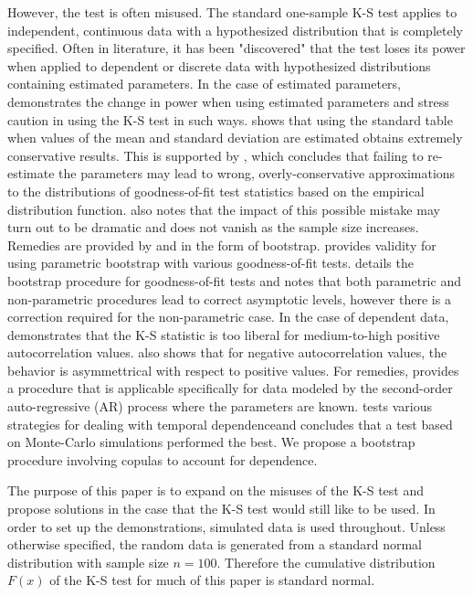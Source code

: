 \documentclass[12pt, letterpaper, titlepage]{article}
\begin{document}
However, the test is often misused. The standard one-sample K-S test applies to 
independent, continuous data with a hypothesized distribution that is completely specified. 
Often in literature, it has been "discovered" that the test loses its power when 
applied to dependent or discrete data with hypothesized distributions containing 
estimated parameters. In the case of estimated parameters, \citet{Steinskog} 
demonstrates the change in power when using estimated parameters and stress caution in 
using the K-S test in such ways. \citet{Lilliefors} shows 
that using the standard table when values of the mean and standard deviation are 
estimated obtains extremely conservative results. This is supported by \citet{Capasso}, which 
concludes that failing to re-estimate the parameters may lead to wrong, overly-conservative 
approximations to the distributions of goodness-of-fit test statistics based on the empirical 
distribution function. \citet{Capasso} also notes that the impact of this possible mistake 
may turn out to be dramatic and does not vanish as the sample size increases. Remedies are provided 
by \citet{Genest} and \citet{Babu} in the form of bootstrap. \citet{Genest} provides validity 
for using parametric bootstrap with various goodness-of-fit tests. \citet{Babu} details 
the bootstrap procedure for goodness-of-fit tests and notes that both parametric and 
non-parametric procedures lead to correct asymptotic levels, however there is a correction 
required for the non-parametric case. In the case of dependent data, \citet{Durilleul} demonstrates
that the K-S statistic is too liberal for medium-to-high positive autocorrelation values. 
\citet{Durilleul} also shows that for negative autocorrelation values, the behavior is 
asymmettrical with respect to positive values. For remedies, \citet{Weiss} provides a 
procedure that is applicable specifically for data modeled by the second-order auto-regressive (AR) 
process where the parameters are known. \citet{Lanzante} tests various strategies for dealing with 
temporal dependenceand concludes that a test based on Monte-Carlo simulations performed the best.
We propose a bootstrap procedure involving copulas to account for dependence.

The purpose of this paper is to expand on the misuses of the K-S test and propose 
solutions in the case that the K-S test would still like to be used. In order to set 
up the demonstrations, simulated data is used throughout. Unless otherwise specified, 
the random data is generated from a standard normal distribution with sample size $n = 100$. 
Therefore the cumulative distribution $F(x)$ of the K-S test for much of this paper is standard normal.
\end{document}

